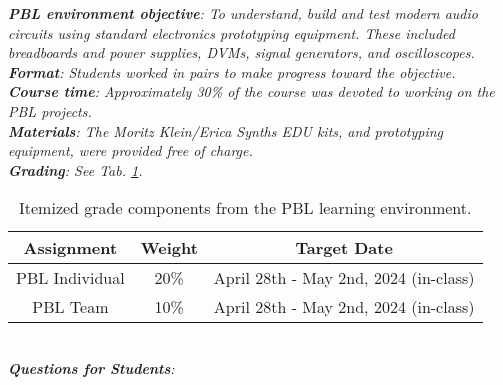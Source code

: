 \documentclass[10pt]{article}
\begin{document}
\maketitle

\begin{abstract}
Our course in modern DSP unfolded in several phases.  First, an overview of digital signal processing (DSP) basics was given in Unit 0. Second, DSP filtering techniques were covered in Unit 1.  Third, DSP applications to audio systems, digital images, electrical circuits, and neural networks were introduced in Unit 2.  Finally, and synchronously with Unit 2, we began a project-based learning (PBL) environment to build modular synthesizer circuits with DSP applications.  We will gather data in this document to assess the PBL learning environment.
\end{abstract}
\noindent
\textit{\textbf{PBL environment objective}: To understand, build and test modern audio circuits using standard electronics prototyping equipment.  These included breadboards and power supplies, DVMs, signal generators, and oscilloscopes.} \\
\textit{\textbf{Format}: Students worked in pairs to make progress toward the objective.} \\
\textit{\textbf{Course time}: Approximately 30\% of the course was devoted to working on the PBL projects.} \\
\textit{\textbf{Materials}: The Moritz Klein/Erica Synths EDU kits, and prototyping equipment, were provided free of charge.} \\
\textit{\textbf{Grading}: See Tab. \ref{tab:grading}.}
\begin{table}[hb]
\centering
\begin{tabular}{| c | c | c |}
\hline
\textbf{Assignment} & \textbf{Weight} & \textbf{Target Date} \\ \hline
PBL Individual & 20\% & April 28th - May 2nd, 2024 (in-class) \\ \hline
PBL Team & 10\% & April 28th - May 2nd, 2024 (in-class) \\ \hline
\end{tabular}
\caption{\label{tab:grading} Itemized grade components from the PBL learning environment.}
\end{table} \\
\textit{\textbf{Questions for Students}:}
\end{document}
